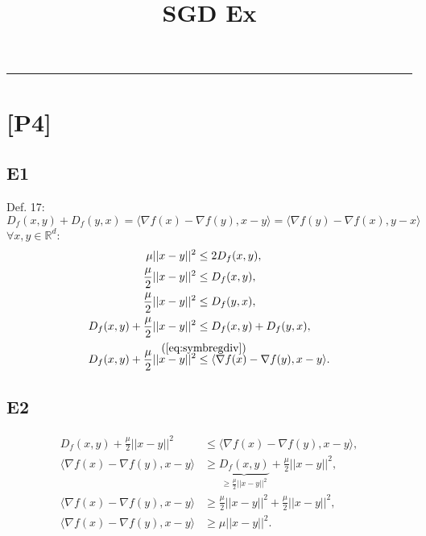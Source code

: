 \documentclass[12pt]{article}
\title{SGD Ex}
\newcommand{\defeq}[2]{\stackrel{\mathclap{\normalfont\mbox{#1}}}{#2}}
\def\att{                    %
        \marginpar[ \hspace*{\fill} \raisebox{-0.2em}{\rule{2mm}{1.2em}} ]
        {\raisebox{-0.2em}{\rule{2mm}{1.2em}} }
        }
\def\at#1{[*** \att #1 ***]}  %
\begin{document}
\maketitle

\hrule
\vspace{0.1cm}
\section*{[P4]}
\subsection*{E1}
Def. 17:
\begin{equation}
    D_f(x, y) + D_f(y, x) = \langle \nabla f(x) - \nabla f(y), x - y \rangle 
                            = \langle \nabla f(y) - \nabla f(x), y - x \rangle
    \label{eq:symbregdiv}
\end{equation}
$\forall x, y \in \mathbb{R}^d $:
\begin{equation}
    \begin{split}
        \mu ||x-y||^2 & \leq 2D_f(x,y), \\
        \frac{\mu}{2} ||x-y||^2 & \leq D_f(x, y), \\
        \frac{\mu}{2} ||x-y||^2 & \leq D_f(y, x), \\
        D_f(x, y) + \frac{\mu}{2} ||x-y||^2 & \leq D_f(x, y) + D_f(y, x), \\
        D_f(x, y) + \frac{\mu}{2} ||x-y||^2 & \defeq{(\refeq{eq:symbregdiv})}{\leq} \langle \nabla f(x) - \nabla f(y), x - y \rangle.
    \end{split}
    \label{eq:E1}
\end{equation}

\subsection*{E2}
\begin{equation}
    \begin{split}
        D_f(x, y) + \frac{\mu}{2} ||x-y||^2 & \leq \langle \nabla f(x) - \nabla f(y), x - y \rangle, \\
        \langle \nabla f(x) - \nabla f(y), x - y \rangle & \geq \underbrace{D_f(x, y)}_{\geq \frac{\mu}{2} ||x-y||^2} + \frac{\mu}{2} ||x-y||^2, \\
        \langle \nabla f(x) - \nabla f(y), x - y \rangle & \geq \frac{\mu}{2} ||x-y||^2 + \frac{\mu}{2} ||x-y||^2, \\
        \langle \nabla f(x) - \nabla f(y), x - y \rangle & \geq \mu ||x-y||^2.
    \end{split}
    \label{eq:E2}
\end{equation}
\vspace{0.1cm}
\end{document}
